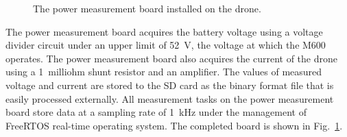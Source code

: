 \documentclass[journal]{./template/IEEEtran}
\begin{document}
\begin{figure}[ht]
\caption{The power measurement board installed on the drone.}
\label{fig:board}
\end{figure}

The power measurement board acquires the battery voltage using a voltage divider circuit under an upper limit of 52~V, the voltage at which the M600 operates. 
The power measurement board also acquires the current of the drone using a 1~milliohm shunt resistor and an amplifier.
The values of measured voltage and current are stored to the SD card as the binary format file that is easily processed externally.
All measurement tasks on the power measurement board store data at a sampling rate of 1~kHz under the management of FreeRTOS real-time operating system.
The completed board is shown in Fig.~\ref{fig:board}.
\end{document}
